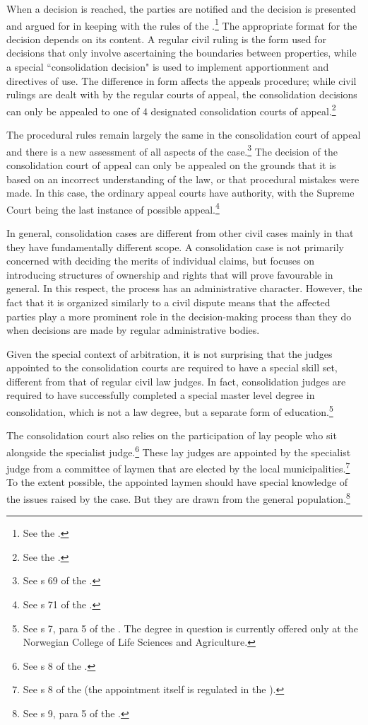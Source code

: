 When a decision is reached, the parties are notified and the decision is presented and argued for in keeping with the rules of the \cite{cda05}.\footnote{See the 
\cite[7|22]{lca79}.} The appropriate format for the decision depends on its content. A regular civil ruling is the form used for decisions that only involve ascertaining the boundaries between properties, while a special ``consolidation decision" is used to implement apportionment and directives of use. The difference in form affects the appeals procedure; while civil rulings are dealt with by the regular courts of appeal, the consolidation decisions can only be appealed to one of 4 designated consolidation courts of appeal.\footnote{See  the \cite[61]{lca79}.}

The procedural rules remain largely the same in the consolidation court of appeal and there is a new assessment of all aspects of the case.\footnote{See s 69 of the \cite{lca79}.} The decision of the consolidation court of appeal can only be appealed on the grounds that it is based on an incorrect understanding of the law, or that procedural mistakes were made. In this case, the ordinary appeal courts have authority, with the Supreme Court being the last instance of possible appeal.\footnote{See s 71 of the \cite{lca79}.}

In general, consolidation cases are different from other civil cases mainly in that they have fundamentally different scope. A consolidation case is not primarily concerned with deciding the merits of individual claims, but focuses on introducing structures of ownership and rights that will prove favourable in general. In this respect, the process has an administrative character. However, the fact that it is organized similarly to a civil dispute means that the affected parties play a more prominent role in the decision-making process than they do when decisions are made by regular administrative bodies.

Given the special context of arbitration, it is not surprising that the judges appointed to the consolidation courts are required to have a special skill set, different from that of regular civil law judges. In fact, consolidation judges are required to have successfully completed a special master level degree in consolidation, which is not a law degree, but a separate form of education.\footnote{See s 7, para 5 of the \cite{lca79}. The degree in question is currently offered only at the Norwegian College of Life Sciences and Agriculture.} 

The consolidation court also relies on the participation of lay people who sit alongside the specialist judge.\footnote{See s 8 of the \cite{lca79}.} These lay judges are appointed by the specialist judge from a committee of laymen that are elected by the local municipalities.\footnote{See s 8 of the \cite{lca79} (the appointment itself is regulated in the \cite[64]{ca15}).} To the extent possible, the appointed laymen should have special knowledge of the issues raised by the case. But they are drawn from the general population.\footnote{See s 9, para 5 of the \cite{lca79}.}

